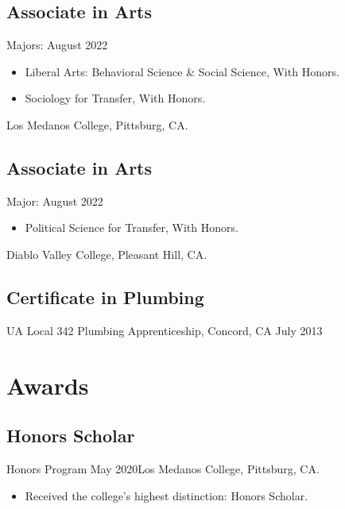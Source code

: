 \documentclass[
]{article}
\providecommand{\tightlist}{%
  \setlength{\itemsep}{0pt}\setlength{\parskip}{0pt}}
\begin{document}
\hypertarget{associate-in-arts}{%
\subsection{Associate in Arts}\label{associate-in-arts}}

Majors: \hfill August 2022

\begin{itemize}
\tightlist
\item
  Liberal Arts: Behavioral Science \& Social Science, With Honors.
\item
  Sociology for Transfer, With Honors.
\end{itemize}

Los Medanos College, Pittsburg, CA.

\hypertarget{associate-in-arts-1}{%
\subsection{Associate in Arts}\label{associate-in-arts-1}}

Major: \hfill August 2022

\begin{itemize}
\tightlist
\item
  Political Science for Transfer, With Honors.
\end{itemize}

Diablo Valley College, Pleasant Hill, CA.

\hypertarget{certificate-in-plumbing}{%
\subsection{Certificate in Plumbing}\label{certificate-in-plumbing}}

UA Local 342 Plumbing Apprenticeship, Concord, CA \hfill July 2013

\section{Awards}

\hypertarget{honors-scholar}{%
\subsection{Honors Scholar}\label{honors-scholar}}

Honors Program \hfill May 2020\newline Los Medanos College, Pittsburg,
CA.

\begin{itemize}
\tightlist
\item
  Received the college's highest distinction: Honors Scholar.
\end{itemize}
\end{document}
